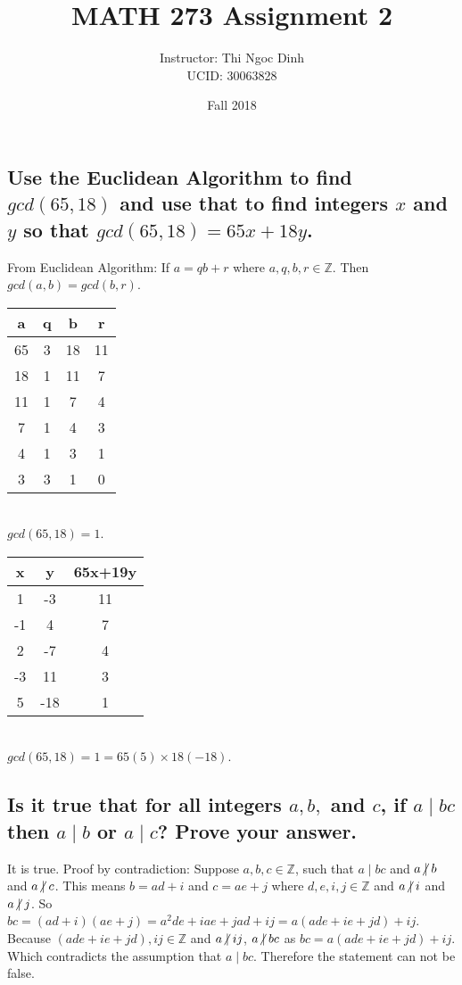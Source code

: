 \documentclass[10pt, letterpaper, titlepage]{article}
\title{MATH 273 Assignment 2}
\author{Instructor: Thi Ngoc Dinh
    \\UCID: 30063828}
\date{Fall 2018}
\newcommand{\0}{\varnothing}
\newcommand{\Z}{\mathbb{Z}}
\newcommand{\1}{\{ 1 \}}
\newcommand{\2}{\{ (1,1) \}}
\newcommand{\notmid}{\centernot|}
\begin{document}
    \maketitle

    \section{ }
        \subsection{Use the Euclidean Algorithm to find $gcd(65,18)$ and use that to find integers $x$ and $y$ so that $gcd(65,18) = 65x + 18y$.}
            From Euclidean Algorithm: If $a = qb + r$ where $a, q, b, r \in \Z$. Then $gcd(a,b) = gcd(b,r)$.
            \\
            \begin{tabular}{ c | c | c | c }
                a & q & b & r \\ \hline
                65 & 3 & 18 & 11 \\
                18 & 1 & 11 & 7 \\
                11 & 1 & 7 & 4 \\
                7 & 1 & 4 & 3 \\
                4 & 1 & 3 & 1 \\
                3 & 3 & 1 & 0 
            \end{tabular}
            \\
            $gcd(65,18) = 1$.
            \\
            \begin{tabular}{ c | c | c }
                x & y & 65x+19y\\ \hline
                1 & -3 & 11\\
                -1 & 4 & 7\\
                2 & -7 & 4\\
                -3 & 11 & 3\\
                5 & -18 & 1
            \end{tabular}
            \\
            $gcd(65,18) = 1 = 65(5) \times 18(-18)$.

        \subsection{Is it true that for all integers $a, b,$ and $c$, if $a \mid bc$ then $a \mid b$ or $a \mid c$? Prove your answer.}
            It is true. Proof by contradiction:
            Suppose $a,b,c \in \Z$, such that $a \mid bc$ and $a \notmid b$ and $a \notmid c$.
            This means $b = ad + i$ and $c = ae + j$ where $d,e, i,j \in \Z$ and $a \notmid i$ and $a \notmid j$.
            So $bc = (ad + i)(ae + j) = a^2de + iae + jad + ij = a(ade+ie+jd) + ij$.
            Because $(ade+ie+jd), ij \in \Z$ and $a \notmid ij$,
            $a \notmid bc$ as $bc = a(ade+ie+jd) + ij$.
            Which contradicts the assumption that $a \mid bc$.
            Therefore the statement can not be false.
\end{document}
